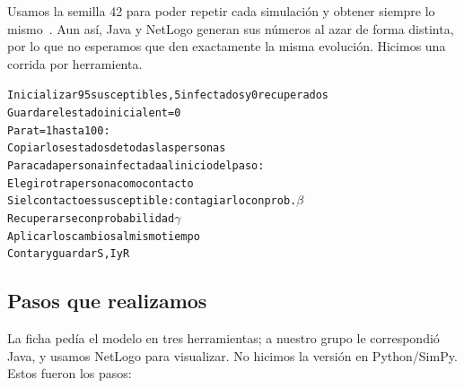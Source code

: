 \documentclass[11pt,a4paper]{article}
\begin{document}
\medskip
Usamos la semilla 42 para poder repetir cada simulación y obtener siempre lo mismo~\cite{java}. Aun así, Java y NetLogo generan sus números al azar de forma distinta, por lo que no esperamos que den exactamente la misma evolución. Hicimos una corrida por herramienta.

\medskip
\noindent\begin{minipage}{\textwidth}
\begin{alltt}\small
Inicializar 95 susceptibles, 5 infectados y 0 recuperados
Guardar el estado inicial en t = 0
Para t = 1 hasta 100:
    Copiar los estados de todas las personas
    Para cada persona infectada al inicio del paso:
        Elegir otra persona como contacto
        Si el contacto es susceptible: contagiarlo con prob. \(\beta\)
        Recuperarse con probabilidad \(\gamma\)
    Aplicar los cambios al mismo tiempo
    Contar y guardar S, I y R
\end{alltt}
\end{minipage}

\subsection{Pasos que realizamos}
La ficha pedía el modelo en tres herramientas; a nuestro grupo le correspondió Java, y usamos NetLogo para visualizar. No hicimos la versión en Python/SimPy. Estos fueron los pasos:
\end{document}
